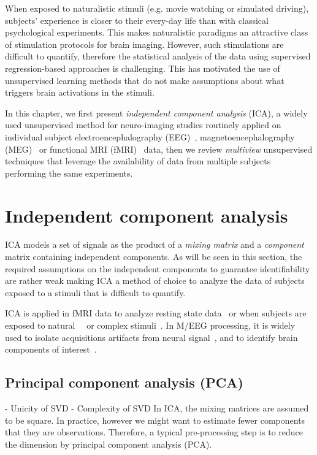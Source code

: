 When exposed to naturalistic stimuli (e.g. movie watching or simulated driving), subjects' experience is closer to their every-day life than with classical
psychological experiments.
% 
This makes naturalistic paradigms an attractive class of
stimulation protocols for brain imaging.
%
However, such stimulations are difficult to quantify, therefore the statistical analysis of the data using supervised regression-based approaches is challenging.
This has motivated the use of unsupervised learning methods that do not make
assumptions about what triggers brain activations in the stimuli.

In this chapter, we first present \emph{independent component analysis} (ICA), a widely used
unsupervised method for neuro-imaging studies routinely applied on individual
subject electroencephalography (EEG)~\cite{makeig1996independent},
magnetoencephalography (MEG)~\cite{vigario1998independent} or functional MRI
(fMRI)~\cite{mckeown1998independent} data, then we review \emph{multiview} unsupervised 
techniques that leverage the availability of data from multiple subjects
performing the same experiments. 

\section{Independent component analysis}
ICA models a set of signals as the product of a \emph{mixing matrix} and a
\emph{component} matrix containing independent components. As will be seen in this
section, the required assumptions on the independent components to guarantee
identifiability are rather weak making ICA a method of choice to analyze the
data of subjects exposed to a stimuli that is difficult to quantify.

ICA is applied in fMRI data to analyze resting state
data~\cite{beckmann2005investigations} or when subjects are
exposed to natural~\cite{malinen2007towards}~\cite{bartels2005brain} or complex stimuli~\cite{calhoun2002different}. 
In M/EEG processing, it is widely used to isolate acquisitions artifacts from neural signal~\cite{jung1998extended}, and to identify brain components of interest~\cite{vigario2000independent, delorme2012independent}.

\subsection{Principal component analysis (PCA)}
- Unicity of SVD
- Complexity of SVD
In ICA, the mixing matrices are assumed to be square. In practice, however we
might want to estimate fewer components that they are observations. Therefore, a
typical pre-processing step is to reduce the dimension by principal component
analysis (PCA). 


